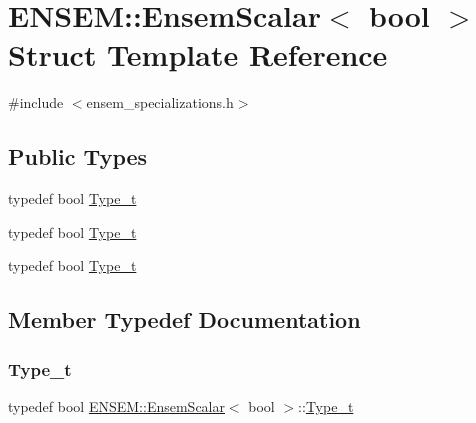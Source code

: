 \hypertarget{structENSEM_1_1EnsemScalar_3_01bool_01_4}{}\section{E\+N\+S\+EM\+:\+:Ensem\+Scalar$<$ bool $>$ Struct Template Reference}
\label{structENSEM_1_1EnsemScalar_3_01bool_01_4}


{\ttfamily \#include $<$ensem\+\_\+specializations.\+h$>$}

\subsection*{Public Types}
\begin{DoxyCompactItemize}
\item 
typedef bool \mbox{\hyperlink{structENSEM_1_1EnsemScalar_3_01bool_01_4_a577829e3cf981727768117428436ac89}{Type\+\_\+t}}
\item 
typedef bool \mbox{\hyperlink{structENSEM_1_1EnsemScalar_3_01bool_01_4_a577829e3cf981727768117428436ac89}{Type\+\_\+t}}
\item 
typedef bool \mbox{\hyperlink{structENSEM_1_1EnsemScalar_3_01bool_01_4_a577829e3cf981727768117428436ac89}{Type\+\_\+t}}
\end{DoxyCompactItemize}


\subsection{Member Typedef Documentation}
\mbox{\label{structENSEM_1_1EnsemScalar_3_01bool_01_4_a577829e3cf981727768117428436ac89}} 
\subsubsection{\texorpdfstring{Type\_t}{Type\_t}\hspace{0.1cm}{\footnotesize\ttfamily [1/3]}}
{\footnotesize\ttfamily typedef bool \mbox{\hyperlink{structENSEM_1_1EnsemScalar}{E\+N\+S\+E\+M\+::\+Ensem\+Scalar}}$<$ bool $>$\+::\mbox{\hyperlink{structENSEM_1_1EnsemScalar_3_01bool_01_4_a577829e3cf981727768117428436ac89}{Type\+\_\+t}}}

\mbox{\label{structENSEM_1_1EnsemScalar_3_01bool_01_4_a577829e3cf981727768117428436ac89}} 
